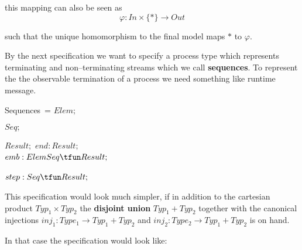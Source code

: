 \documentclass[landscape, autoslides, light]{mmiss}
\newcommand{\ns}{\normalsize}
\begin{document}
\begin{Package}[Label={FSDPT}, Title={Formal Specification of Data and Process Types}, ShortTitle={FSDPT}, Authors={Horst Reichel}, Date={February 2003}, LevelOfDetail=Lecture, Language=en-GB]
\begin{Section}[Title={Final Coalgebras as Process Types}, Label={section4}]
\begin{Section}[Title={Examples of Process Types}, Label={section4_2}]
\begin{Paragraph}[Title={Function Type}, Label=Paragraph107]
this mapping can also be seen as $$\varphi : In \times \{ * \} \to
Out$$ \pause

such that the unique homomorphism to the final model maps $*$ to
$\varphi$.

\end{Paragraph}
\begin{Paragraph}[Title={Observable Termination}, Label=Paragraph108]
\ns

 By the next specification we want to specify a process type
which represents terminating and non--terminating  streams which
we call \textbf{sequences}. To represent the the observable
termination of a process we need something like runtime message.

\end{Paragraph}
\begin{Paragraph}[Title={Observable Termination}, Label=Paragraph109]
\small
\begin{SpecDefn}{Sequences}~=
\I\Sort \( Elem; \) \item[\Then] \item[\Cofree~\Group]
\begin{Items}
\I\Sort \( Seq; \) \item[\Then] \item[\Free~\Group]
\begin{Items}
\I\Sort \( Result; \) \I\Ops \( end : Result; \)
 \\ \( emb : Elem \* Seq \tfun Result;\)
  ~\EndGroup \end{Items}
  \I\Ops \( step : Seq \tfun Result;\)
 ~\EndGroup \end{Items}  \item[\End]
\end{SpecDefn}

\end{Paragraph}
\begin{Paragraph}[Title={Observable Termination}, Label=Paragraph110]
\ns
 This specification would look much simpler, if in addition to
the cartesian product $Typ_1 \times Typ_2$ the \textbf{disjoint
union} $Typ_1 + Typ_2$ together with the canonical injections
$inj_1 : Type_1 \to  Typ_1 + Typ_2$ and $inj_2 : Type_2 \to  Typ_1
+ Typ_2$ is on hand.

 \vspace{8mm}

 In that case the specification
would look like:


\end{Paragraph}
\end{Section}
\end{Section}
\end{Package}
\end{document}

